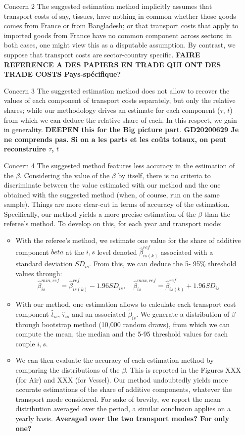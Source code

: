 \documentclass[a4paper,12pt]{article}
\begin{document}
\begin{itemize}
\begin{enumerate}
    \end{enumerate}
\item[Concern 2] The suggested estimation method implicitly assumes that transport costs of say, tissues, have nothing in common whether those goods comes from France or from Bangladesh; or that transport costs that apply to imported goods from France have no common component across sectors; in both cases, one might view this as a disputable assumption. By contrast, we suppose that transport costs are sector-country specific. \textbf{FAIRE REFERENCE A DES PAPIERS EN TRADE QUI ONT DES TRADE COSTS Pays-spécifique?}
\item[Concern 3] The suggested estimation method does not allow to recover the values of each component of transport costs separately, but only the relative shares; while our methodology drives an estimate for each component ($\tau$, $t$) from which we can deduce the relative share of each. In this respect, we gain in generality. \textbf{DEEPEN this for the Big picture part}.
\textbf{GD20200629 Je ne comprends pas. Si on a les parts et les coûts totaux, on peut reconstruire $\tau$, $t$}
\item[Concern 4] The suggested method features less accuracy in the estimation of the $\beta$. Considering the value of the $\beta$ by itself, there is no criteria to discriminate between the value estimated with our method and the one obtained with the suggested method (when, of course, run on the same sample). Things are more clear-cut in terms of accuracy of the estimation. Specifically, our method yields a more precise estimation of the $\beta$ than the referee's method. To develop on this, for each year and transport mode:
    \begin{itemize}
    \item With the referee's method, we estimate one value for the share of additive component $beta$ at the $i,s$ level denoted $\hat{\beta}^{ref}_{is(k)}$ associated with a standard deviation $SD_{is}$. From this, we can deduce the 5- 95\% threshold values through:
        $$\hat{\beta}_{is}^{min,ref} = \hat{\beta}^{ref}_{is(k)} - 1.96 SD_{is},\quad \hat{\beta}_{is}^{max,ref} = \hat{\beta}^{ref}_{is(k)} + 1.96 SD_{is}$$

    \item  With our method, one estimation allows to calculate each transport cost component $\hat{t}_{is}$, $\hat{\tau}_{is}$ and an associated $\hat{\beta}_{is}$. We generate a distribution of $\beta$ through bootstrap method (10,000 random draws), from which we can compute the mean, the median and the 5-95 threshold values for each couple $i,s$.
    \item We can then evaluate the accuracy of each estimation method by comparing the distributions of the $\beta$. This is reported in the Figures XXX (for Air) and XXX (for Vessel). Our method undoubtedly yields more accurate estimations of the share of additive components, whatever the transport mode considered. For sake of brevity, we report the mean distribution averaged over the period, a similar conclusion applies on a yearly basis. \textbf{Averaged over the two transport modes? For only one?}



\end{itemize}
\end{itemize}
\end{document}

